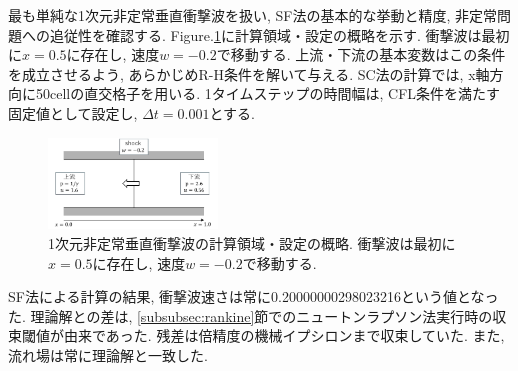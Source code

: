 \documentclass[a4j]{jarticle}
\begin{document}
最も単純な1次元非定常垂直衝撃波を扱い, SF法の基本的な挙動と精度, 非定常問題への追従性を確認する.
Figure.\ref{fig:1Dsituation}に計算領域・設定の概略を示す.
衝撃波は最初に$x=0.5$に存在し, 速度$w=-0.2$で移動する.
上流・下流の基本変数はこの条件を成立させるよう, あらかじめR-H条件を解いて与える.
SC法の計算では, x軸方向に50cellの直交格子を用いる.
1タイムステップの時間幅は, CFL条件を満たす固定値として設定し, $\Delta t = 0.001$とする.
\begin{figure}[H]
    \vspace*{-5mm}
    \begin{center}
        \includegraphics[width=0.4\textwidth]{1Dsituation.pdf}
    \end{center}
    \caption{1次元非定常垂直衝撃波の計算領域・設定の概略.
    衝撃波は最初に$x=0.5$に存在し, 速度$w=-0.2$で移動する.}
    \label{fig:1Dsituation}
\end{figure}
SF法による計算の結果, 衝撃波速さは常に0.20000000298023216という値となった.
理論解との差は, \ref{subsubsec:rankine}節でのニュートンラプソン法実行時の収束閾値が由来であった. 
残差は倍精度の機械イプシロンまで収束していた. また, 流れ場は常に理論解と一致した.
\end{document}
